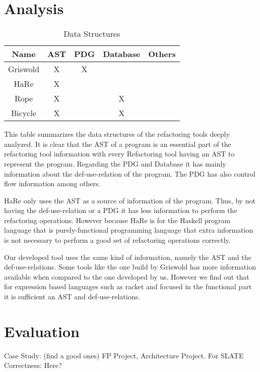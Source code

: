 \section{Analysis}
\begin{table}[]
\centering
\caption{Data Structures}
\label{my-label}
\begin{tabular}{c|c|c|c|c}
Name     & AST & PDG & Database & Others \\ \hline
Griswold & X   & X   &          &        \\ \hline
HaRe     & X   &     &          &        \\ \hline
Rope     & X   &     & X        &        \\ \hline
Bicycle  & X   &     & X        &
\end{tabular}
\end{table}
This table summarizes the data structures of the refactoring tools deeply analyzed.
It is clear that the AST of a program is an essential part of the refactoring
tool information with every Refactoring tool having an AST to represent the program.
Regarding the PDG and Database it has mainly information about the def-use-relation
of the program. The PDG has also control flow information among others.

HaRe only uses the AST as a source of information of the program. Thus, by not having
the def-use-relation or a PDG it has less information to perform the refactoring operations.
However because HaRe is for the Haskell program language that is purely-functional
programming language that extra information is not necessary to perform a good set of
refactoring operations correctly.

Our developed tool uses the same kind of information, namely the AST and the def-use-relations.
Some tools like the one build by Griswold has more information available when compared
to the one developed by us. However we find out that for expression based languages
such as racket and focused in the functional part it is sufficient an AST and
def-use-relations.






\section{Evaluation}
Case Study: (find a good ones) FP Project, Architecture Project. For SLATE
Correctness: Here?
